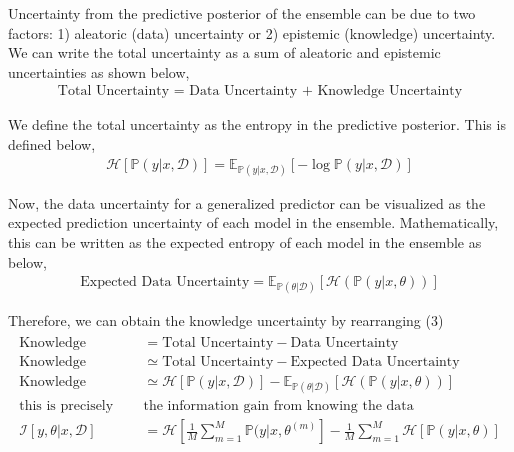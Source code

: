 \documentclass{article}
\begin{document}
Uncertainty from the predictive posterior of the ensemble can be due to two factors: 1) aleatoric (data) uncertainty or 2) epistemic (knowledge) uncertainty. We can write the total uncertainty as a sum of aleatoric and epistemic uncertainties as shown below,
\begin{align}
	\text{Total Uncertainty = Data Uncertainty + Knowledge Uncertainty}
\end{align}

We define the total uncertainty as the entropy in the predictive posterior. This is defined below,
\begin{align}
	\mathcal{H} \left[ \mathbb{P}(y|x, \mathcal{D}) \right] = \mathbb{E}_{\mathbb{P}(y|x,\mathcal{D})} \left[ - \log{\mathbb{P}(y|x,\mathcal{D})} \right]
\end{align}

Now, the data uncertainty for a generalized predictor can be visualized as the expected prediction uncertainty of each model in the ensemble. Mathematically, this can be written as the expected entropy of each model in the ensemble as below,
\begin{align}
	\text{Expected Data Uncertainty} = \mathbb{E}_{\mathbb{P}(\theta|\mathcal{D})} \left[ \mathcal{H}(\mathbb{P}(y|x,\theta)) \right]
\end{align}

Therefore, we can obtain the knowledge uncertainty by rearranging (3)
\begin{align}
	\begin{split}
		\text{Knowledge Uncertainty} &= \text{Total Uncertainty} - \text{Data Uncertainty}\\
		\text{Knowledge Uncertainty} &\simeq \text{Total Uncertainty} - \text{Expected Data Uncertainty}\\
		\text{Knowledge Uncertainty} &\simeq \mathcal{H} \left[ \mathbb{P}(y|x, \mathcal{D}) \right] - \mathbb{E}_{\mathbb{P}(\theta|\mathcal{D})} \left[ \mathcal{H}(\mathbb{P}(y|x,\theta)) \right]\\
		\text{this is precisely } &\text{the information gain from knowing the data}\\
		\mathcal{I}\left[ y, \theta | x, \mathcal{D} \right] &= \mathcal{H} \left[ \frac{1}{M} \sum\limits_{m=1}^M \mathbb{P}(y|x,\theta^{(m)} \right] - \frac{1}{M} \sum\limits_{m=1}^M \mathcal{H}\left[ \mathbb{P}(y|x,\theta) \right]
	\end{split}
\end{align}
\end{document}
